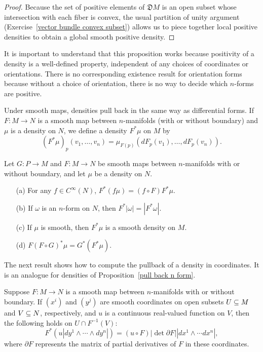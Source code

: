 \begin{proof}
Because the set of positive elements of $\mathfrak{D}M$ is an open subset whose intersection with each fiber is convex, the usual partition of 
unity argument (Exercise~\ref{vector bundle convex subset}) allows us to piece together local positive densities to obtain a global smooth positive density.
\end{proof}
It is important to understand that this proposition works because positivity of a density is a well-defined property, independent of any 
choices of coordinates or orientations. There is no corresponding existence result for orientation forms because without a choice of orientation, 
there is no way to decide which $n$-forms are positive.\par
Under smooth maps, densities pull back in the same way as differential forms. If $F:M\to N$ is a smooth map between $n$-manifolds (with or without boundary) and
$\mu$ is a density on $N$, we define a density $F^*\mu$ on $M$ by
\[(F^*\mu)_p(v_1,\dots,v_n)=\mu_{F(p)}(dF_p(v_1),\dots,dF_p(v_n)).\]
\begin{proposition}\label{density pull back prop}
Let $G:P\to M$ and $F:M\to N$ be smooth maps between $n$-manifolds with or without boundary, and let $\mu$ be a density on $N$.
\begin{itemize}
\item[(a)] For any $f\in C^\infty(N)$, $F^*(f\mu)=(f\circ F)F^*\mu$.
\item[(b)] If $\omega$ is an $n$-form on $N$, then $F^*|\omega|=|F^*\omega|$.
\item[(c)] If $\mu$ is smooth, then $F^*\mu$ is a smooth density on $M$.
\item[(d)] $F(F\circ G)^*\mu=G^*(F^*\mu)$.
\end{itemize}
\end{proposition}
The next result shows how to compute the pullback of a density in coordinates. It is an analogue for densities of Proposition~\ref{pull back n form}.
\begin{proposition}
Suppose $F:M\to N$ is a smooth map between $n$-manifolds with or without boundary. If $(x^i)$ and $(y^j)$ are smooth coordinates on open subsets $U\subseteq M$ 
and $V\subseteq N$, respectively, and $u$ is a continuous real-valued function on $V$, then the following holds on $U\cap F^{-1}(V)$:
\[F^*(u|dy^1\wedge\cdots\wedge dy^n|)=(u\circ F)|\det\partial F||dx^1\wedge\cdots dx^n|,\]
where $\partial F$ represents the matrix of partial derivatives of $F$ in these coordinates.
\end{proposition}
